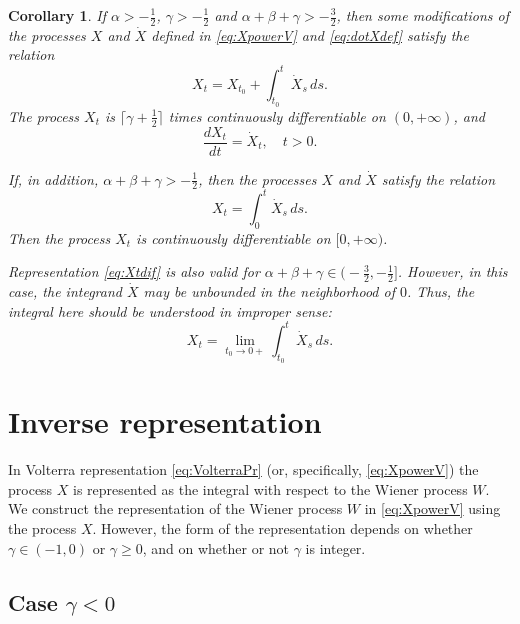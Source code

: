 \documentclass{article}
\newcommand{\dotX}{\dot{X}}
\theoremstyle{plain}
\newtheorem{corollary}{Corollary}
\theoremstyle{remark}
\theoremstyle{definition}
\begin{document}
\begin{corollary}\label{corollary:dXdt}
If $\alpha>-\frac12$, $\gamma>-\frac12$ and $\alpha+\beta+\gamma>-\frac32$,
then some modifications of the processes $X$ and $\dotX$ defined in
\eqref{eq:XpowerV} and \eqref{eq:dotXdef} satisfy
the relation
\[
	X_t = X_{t_0} + \int_{t_0}^t \dotX_s \, ds.
\]
The process $X_t$ is $\lceil\gamma+\frac12\rceil$ times
	continuously differentiable on $(0,{+}\infty)$,
	and
	\begin{equation}\label{eq:dXtdXt}
		\frac{d X_t}{dt} = \dotX_t,\quad t>0.
	\end{equation}

If, in addition, $\alpha+\beta+\gamma>-\frac12$,  then
the processes $X$ and $\dotX$ satisfy the relation
\begin{equation}\label{eq:Xtdif}
X_t = \int_0^t \dotX_s \, ds.
\end{equation}
Then the process $X_t$ is continuously differentiable on $[0,{+}\infty)$.

Representation \eqref{eq:Xtdif} is also valid for
$\alpha+\beta+\gamma \in \bigl(-\frac32, -\frac12\bigr]$.
However, in this case, the integrand $\dotX$ may be unbounded
in the neighborhood of $0$.  Thus,
the integral here should be understood in improper sense:
	\[
		X_t = \lim_{t_0\to 0+} \int_{t_0}^t \dotX_s \, ds.
	\]
\end{corollary}




\section{Inverse representation}
In Volterra representation \eqref{eq:VolterraPr}
(or, specifically, \eqref{eq:XpowerV})
the process $X$ is represented as the integral
with respect to the Wiener process $W$.
We construct the representation
of the Wiener process $W$ in \eqref{eq:XpowerV}
using the process $X$.
However, the form of the representation
depends on whether $\gamma\in(-1,0)$
or $\gamma\ge 0$, and on whether or not $\gamma$ is integer.


\subsection[Case $\gamma<0$]{Case \boldmath$\gamma<0$}
\end{document}
